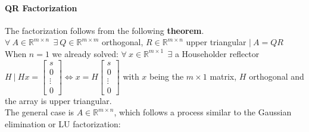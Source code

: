 \documentclass[10pt]{report}
\begin{document}
\paragraph{QR Factorization} The factorization follows from the following \textbf{theorem}.\\
$\forall\:A\in \mathbb{R}^{m\times n}\:\:\exists\:Q\in \mathbb{R}^{m\times m}$ orthogonal, $R\in \mathbb{R}^{m\times n}$ upper triangular $|\:A = QR$\\
When $n = 1$ we already solved: $\forall\:x\in \mathbb{R}^{m\times 1}\:\:\exists$ a Householder reflector $H\:|\:Hx = \left[\begin{array}{c}
s\\0\\\vdots\\0
\end{array}\right] \Leftrightarrow x = H\left[\begin{array}{c}
s\\0\\\vdots\\0
\end{array}\right]$ with $x$ being the $m\times 1$ matrix, $H$ orthogonal and the array is upper triangular.\\
The general case is $A\in \mathbb{R}^{m\times n}$, which follows a process similar to the Gaussian elimination or LU factorization:
\end{document}

